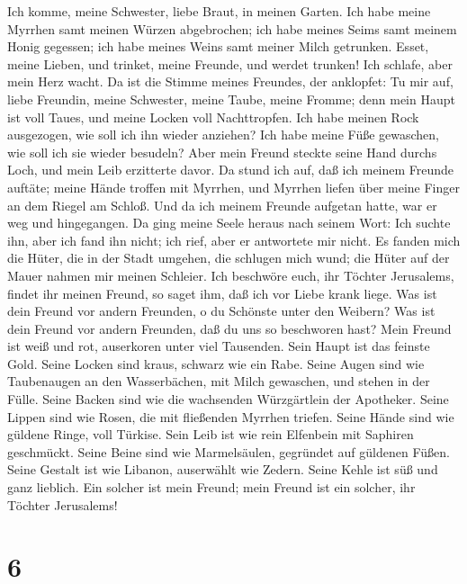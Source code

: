  Ich komme, meine Schwester, liebe Braut, in meinen Garten.
Ich habe meine Myrrhen samt meinen Würzen abgebrochen; ich habe meines
Seims samt meinem Honig gegessen; ich habe meines Weins samt meiner
Milch getrunken. Esset, meine Lieben, und trinket, meine Freunde, und
werdet trunken!  Ich schlafe, aber mein Herz wacht. Da ist
die Stimme meines Freundes, der anklopfet: Tu mir auf, liebe Freundin,
meine Schwester, meine Taube, meine Fromme; denn mein Haupt ist voll
Taues, und meine Locken voll Nachttropfen.  Ich habe meinen
Rock ausgezogen, wie soll ich ihn wieder anziehen? Ich habe meine Füße
gewaschen, wie soll ich sie wieder besudeln?  Aber mein
Freund steckte seine Hand durchs Loch, und mein Leib erzitterte davor.
 Da stund ich auf, daß ich meinem Freunde auftäte; meine
Hände troffen mit Myrrhen, und Myrrhen liefen über meine Finger an dem
Riegel am Schloß.  Und da ich meinem Freunde aufgetan hatte,
war er weg und hingegangen. Da ging meine Seele heraus nach seinem Wort:
Ich suchte ihn, aber ich fand ihn nicht; ich rief, aber er antwortete
mir nicht.  Es fanden mich die Hüter, die in der Stadt
umgehen, die schlugen mich wund; die Hüter auf der Mauer nahmen mir
meinen Schleier.  Ich beschwöre euch, ihr Töchter
Jerusalems, findet ihr meinen Freund, so saget ihm, daß ich vor Liebe
krank liege.  Was ist dein Freund vor andern Freunden, o du
Schönste unter den Weibern? Was ist dein Freund vor andern Freunden, daß
du uns so beschworen hast?  Mein Freund ist weiß und rot,
auserkoren unter viel Tausenden.  Sein Haupt ist das
feinste Gold. Seine Locken sind kraus, schwarz wie ein Rabe.
 Seine Augen sind wie Taubenaugen an den Wasserbächen, mit
Milch gewaschen, und stehen in der Fülle.  Seine Backen
sind wie die wachsenden Würzgärtlein der Apotheker. Seine Lippen sind
wie Rosen, die mit fließenden Myrrhen triefen.  Seine Hände
sind wie güldene Ringe, voll Türkise. Sein Leib ist wie rein Elfenbein
mit Saphiren geschmückt.  Seine Beine sind wie
Marmelsäulen, gegründet auf güldenen Füßen. Seine Gestalt ist wie
Libanon, auserwählt wie Zedern.  Seine Kehle ist süß und
ganz lieblich. Ein solcher ist mein Freund; mein Freund ist ein solcher,
ihr Töchter Jerusalems!

\hypertarget{section-5}{%
\section{6}\label{section-5}}

